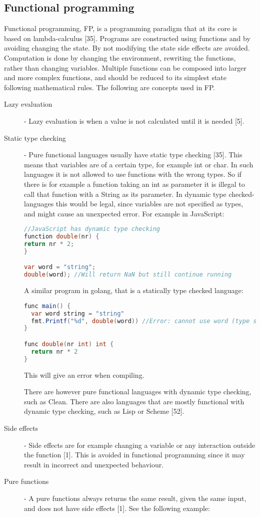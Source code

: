 \documentclass {article}
\begin{document}
\subsection{Functional programming}
Functional programming, FP, is a programming paradigm that at its core is based on lambda-calculus [35]. Programs are constructed using functions and by avoiding changing the state. By not modifying the state side effects are avoided. Computation is done by changing the environment, rewriting the functions, rather than changing variables. Multiple functions can be composed into larger and more complex functions, and should be reduced to its simplest state following mathematical rules. The following are concepts used in FP.
\begin{description}
\item [Lazy evaluation] - Lazy evaluation is when a value is not calculated until it is needed [5].
\item [Static type checking] - Pure functional languages usually have static type checking [35]. This means that variables are of a certain type, for example int or char. In such languages it is not allowed to use functions with the wrong types. So if there is for example a function taking an int as parameter it is illegal to call that function with a String as its parameter. In dynamic type checked-languages this would be legal, since variables are not specified as types, and might cause an unexpected error. For example in JavaScript:

\begin{lstlisting}[language=Java]
//JavaScript has dynamic type checking
function double(nr) {
return nr * 2;
}

var word = "string";
double(word); //Will return NaN but still continue running
\end{lstlisting}

\item [ ] A similar program in golang, that is a statically type checked language:

\begin{lstlisting}[language=Java]
func main() {
  var word string = "string"
  fmt.Printf("%d", double(word)) //Error: cannot use word (type string) as type int in argument to double
}

func double(nr int) int {
  return nr * 2
}
\end{lstlisting}

\item [ ] This will give an error when compiling.
\item[] There are however pure functional languages with dynamic type checking, such as Clean. There are also languages that are mostly functional with dynamic type checking, such as Lisp or Scheme [52].
\item [Side effects] - Side effects are for example changing a variable or any interaction outside the function [1]. This is avoided in functional programming since it may result in incorrect and unexpected behaviour. 
\item [Pure functions] - A pure functions always returns the same result, given the same input, and does not have side effects [1]. See the following example: 


\end{description}
\end{document}
